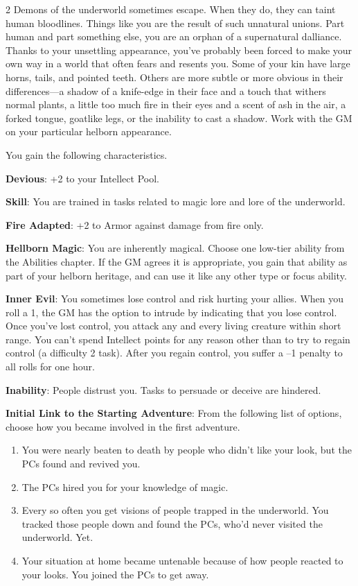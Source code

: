 \begin{multicols}{2}
Demons of the underworld sometimes escape. When they do, they can taint human bloodlines. Things like you are the result of such unnatural unions. Part human and part something else, you are an orphan of a supernatural dalliance. Thanks to your unsettling appearance, you’ve probably been forced to make your own way in a world that often fears and resents you. Some of your kin have large horns, tails, and pointed teeth. Others are more subtle or more obvious in their differences—a shadow of a knife-edge in their face and a touch that withers normal plants, a little too much fire in their eyes and a scent of ash in the air, a forked tongue, goatlike legs, or the inability to cast a shadow. Work with the GM on your particular helborn appearance.

You gain the following characteristics. 

\textbf{Devious}: +2 to your Intellect Pool.

\textbf{Skill}: You are trained in tasks related to magic lore and lore of the underworld.

\textbf{Fire Adapted}: +2 to Armor against damage from fire only.

\textbf{Hellborn Magic}: You are inherently magical. Choose one low-tier ability from the Abilities chapter. If the GM agrees it is appropriate, you gain that ability as part of your helborn heritage, and can use it like any other type or focus ability.

\textbf{Inner Evil}: You sometimes lose control and risk hurting your allies. When you roll a 1, the GM has the option to intrude by indicating that you lose control. Once you’ve lost control, you attack any and every living creature within short range. You can’t spend Intellect points for any reason other than to try to regain control (a difficulty 2 task). After you regain control, you suffer a –1 penalty to all rolls for one hour.

\textbf{Inability}: People distrust you. Tasks to persuade or deceive are hindered.

\textbf{Initial Link to the Starting Adventure}: From the following list of options, choose how you became involved in the first adventure.

\begin{enumerate}
\item You were nearly beaten to death by people who didn’t like your look, but the PCs found and revived you.
\item The PCs hired you for your knowledge of magic.
\item Every so often you get visions of people trapped in the underworld. You tracked those people down and found the PCs, who’d never visited the underworld. Yet.
\item Your situation at home became untenable because of how people reacted to your looks. You joined the PCs to get away.
\end{enumerate}


\end{multicols}
